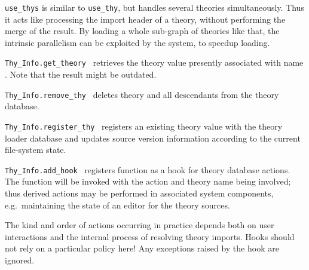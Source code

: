 \begin{isabellebody}
\begin{isamarkuptext}
\begin{description}
  \item \verb|use_thys| is similar to \verb|use_thy|, but handles
  several theories simultaneously.  Thus it acts like processing the
  import header of a theory, without performing the merge of the
  result.  By loading a whole sub-graph of theories like that, the
  intrinsic parallelism can be exploited by the system, to speedup
  loading.

  \item \verb|Thy_Info.get_theory|~ retrieves the theory value
  presently associated with name .  Note that the result
  might be outdated.

  \item \verb|Thy_Info.remove_thy|~ deletes theory  and all
  descendants from the theory database.

  \item \verb|Thy_Info.register_thy|~ registers an
  existing theory value with the theory loader database and updates
  source version information according to the current file-system
  state.

  \item \verb|Thy_Info.add_hook|~ registers function  as a hook for theory database actions.  The function will be
  invoked with the action and theory name being involved; thus derived
  actions may be performed in associated system components, e.g.\
  maintaining the state of an editor for the theory sources.

  The kind and order of actions occurring in practice depends both on
  user interactions and the internal process of resolving theory
  imports.  Hooks should not rely on a particular policy here!  Any
  exceptions raised by the hook are ignored.

  \end{description}%
\end{isamarkuptext}%
\isamarkuptrue%
%
\endisatagmlref
{\isafoldmlref}%
%
\isadelimmlref
%
\endisadelimmlref
%
\isadelimtheory
%
\endisadelimtheory
%
\isatagtheory
{}\isamarkupfalse%
%
\endisatagtheory
{\isafoldtheory}%
%
\isadelimtheory
%
\endisadelimtheory
\isanewline
\end{isabellebody}%
